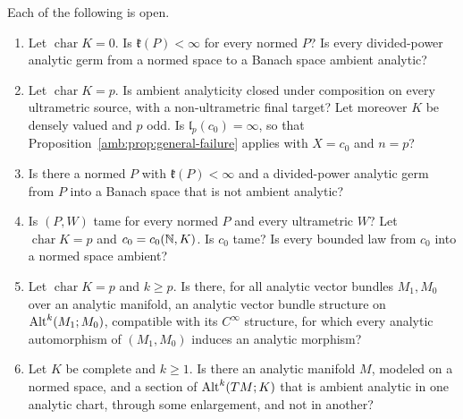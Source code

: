 \begin{question}\label{amb:q:open}
Each of the following is open.
\begin{enumerate}
\item Let $\operatorname{char}K=0$. Is $\mathfrak k(P)<\infty$ for every normed $P$? Is every divided-power analytic germ from a normed space to a Banach space ambient analytic?
\item Let $\operatorname{char}K=p$. Is ambient analyticity closed under composition on every ultrametric source, with a non-ultrametric final target? Let moreover $K$ be densely valued and $p$ odd. Is $\mathfrak l_p(c_0)=\infty$, so that Proposition~\ref{amb:prop:general-failure} applies with $X=c_0$ and $n=p$?
\item Is there a normed $P$ with $\mathfrak k(P)<\infty$ and a divided-power analytic germ from $P$ into a Banach space that is not ambient analytic?
\item Is $(P,W)$ tame for every normed $P$ and every ultrametric $W$? Let $\operatorname{char}K=p$ and $c_0=c_0(\mathbb N,K)$. Is $c_0$ tame? Is every bounded law from $c_0$ into a normed space ambient?
\item Let $\operatorname{char}K=p$ and $k\ge p$. Is there, for all analytic vector bundles $M_1,M_0$ over an analytic manifold, an analytic vector bundle structure on $\operatorname{Alt}^k(M_1;M_0)$, compatible with its $C^\infty$ structure, for which every analytic automorphism of $(M_1,M_0)$ induces an analytic morphism?
\item Let $K$ be complete and $k\ge1$. Is there an analytic manifold $M$, modeled on a normed space, and a section of $\operatorname{Alt}^k(TM;K)$ that is ambient analytic in one analytic chart, through some enlargement, and not in another?
\end{enumerate}
\end{question}
